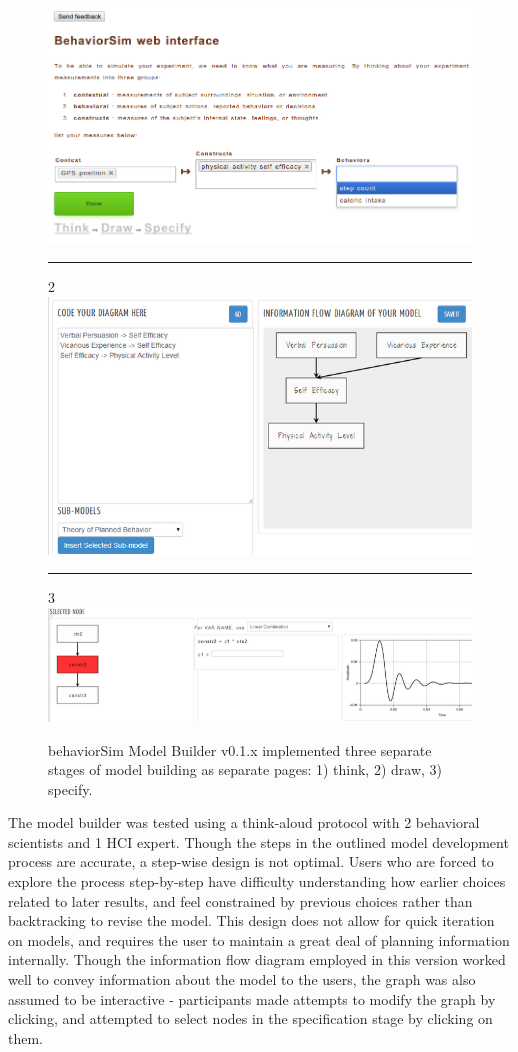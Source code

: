 \documentclass[conference]{IEEEtran}
\begin{document}

\begin{figure}[!t]
  \includegraphics[width=0.9\columnwidth]{img/v1-think}
  \rule{\columnwidth}{0.4pt}
  2
  \includegraphics[width=0.9\columnwidth]{img/v1-draw}
  \rule{\columnwidth}{0.4pt}
  3
  \includegraphics[width=0.9\columnwidth]{img/v1-specify}  
  \caption{behaviorSim Model Builder v0.1.x implemented three separate stages of model building as separate pages: 1) think, 2) draw, 3) specify.}
  \label{model-builder-v1}
\end{figure}

The model builder was tested using a think-aloud protocol with 2 behavioral scientists and 1 HCI expert. 
Though the steps in the outlined model development process are accurate, a step-wise design is not optimal.
Users who are forced to explore the process step-by-step have difficulty understanding how earlier choices related to later results, and feel constrained by previous choices rather than backtracking to revise the model.
This design does not allow for quick iteration on models, and requires the user to maintain a great deal of planning information internally.
Though the information flow diagram employed in this version worked well to convey information about the model to the users, the graph was also assumed to be interactive - participants made attempts to modify the graph by clicking, and attempted to select nodes in the specification stage by clicking on them.
\end{document}
